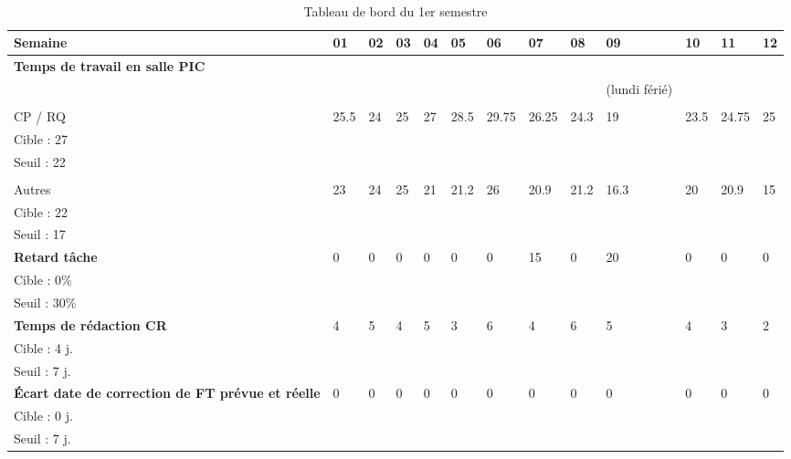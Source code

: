\documentclass[asi,sansVersion]{picInsa}
\begin{document}
	\begin{landscape}
	\begin{center}
		\LARGE
		\textsc{
			\TB{}\\
		}
	\end{center}
	\vspace{0.5cm}


		\begin{longtable}{|p{2.2cm}|p{1cm}|p{1cm}|p{1cm}|p{1cm}|p{1cm}|p{1cm}|p{1cm}|p{1cm}|p{1cm}|p{1cm}|p{1cm}|p{1cm}|}
		\caption{Tableau de bord du 1er semestre}\\\hline
			\rowcolor[gray]{0.85}
			Semaine & 01 & 02 & 03 & 04 & 05 & 06 & 07 & 08 & 09 & 10 & 11 & 12 \\\hline
			\footnotesize
			\textbf{Temps de travail en salle PIC} &  &  &  &  &  &  &  &  &  &  &  &\\ 
			&  &  &  &  &  &  &  &  & (lundi férié) &  &  &\\
			&  &  &  &  &  &  &  &  &  &  &  &\\
			CP / RQ & 25.5 & 24 & 25 & 27 & 28.5 & 29.75 & 26.25 & 24.3 & 19 & 23.5 & 24.75 & 25 \\
			Cible : 27 &  &  &  &  &  &  &  &  &  &  &  &\\
			Seuil : 22 &  &  &  &  &  &  &  &  &  &  &  &\\
			&  &  &  &  &  &  &  &  &  &  &  &\\
			Autres & 23 & 24 & 25 & 21 & 21.2 & 26 & 20.9 & 21.2 & 16.3 & 20 & 20.9 & 15\\
			Cible : 22 &  &  &  &  &  &  &  &  &  &  &  &\\
			Seuil : 17 &  &  &  &  &  &  &  &  &  &  &  &\\\hline
			\footnotesize
			\textbf{Retard tâche} & 0 & 0 & 0 & 0 & 0 & 0 & 15 & 0 & 20 & 0 & 0 & 0 \\
			Cible : 0\% &  &  &  &  &  &  &  &  &  &  &  &\\
			Seuil : 30\% &  &  &  &  &  &  &  &  &  &  &  &\\\hline
			\footnotesize
			\textbf{Temps de rédaction CR} & 4 & 5 & 4 & 5 & 3 & 6 & 4 & 6 & 5 & 4 & 3 & 2 \\
			Cible : 4 j. &  &  &  &  &  &  &  &  &  &  &  &\\
			Seuil : 7 j. &  &  &  &  &  &  &  &  &  &  &  &\\\hline
			\footnotesize
			\textbf{Écart date de correction de FT prévue et réelle} & 0 & 0 & 0 & 0 & 0 & 0 & 0 & 0 & 0 & 0 & 0 & 0 \\
			Cible : 0 j. &  &  &  &  &  &  &  &  &  &  &  &\\
			Seuil : 7 j. &  &  &  &  &  &  &  &  &  &  &  &\\\hline
			
		\end{longtable}
	\end{landscape}
\end{document}
